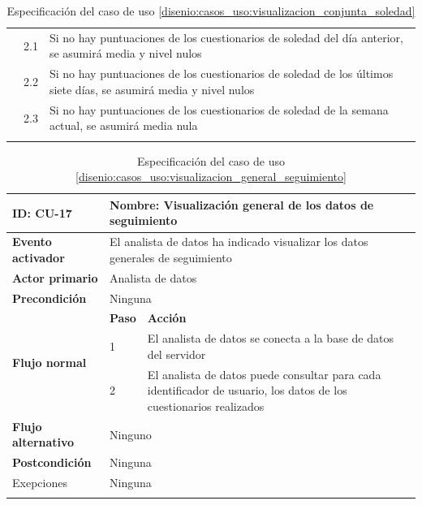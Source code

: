 \begin{table}[h]
\begin{tabularx}{\textwidth}{|l|l|X|}
                    \cline{2-3} & 2.1 & Si no hay puntuaciones de los cuestionarios de soledad del día anterior, se asumirá media y nivel nulos \\
                    \cline{2-3} & 2.2 & Si no hay puntuaciones de los cuestionarios de soledad de los últimos siete días, se asumirá media y nivel nulos \\
                    \cline{2-3} & 2.3 & Si no hay puntuaciones de los cuestionarios de soledad de la semana actual, se asumirá media nula \\
                    \hline
                    \caption{Especificación del caso de uso \ref{disenio:casos_uso:visualizacion_conjunta_soledad}}
                    \label{tabla:casos_uso:visualizacion_conjunta_soledad}
                \end{tabularx}
            \end{table}

            \begin{table}[h]
                \centering
                \begin{tabularx}{\textwidth}{|l|l|X|}
                    \hline
                    \textbf{ID:} CU-17 & \multicolumn{2}{|X|}{\textbf{Nombre}: Visualización general de los datos de seguimiento} \\
                    \hline
                    \textbf{Evento activador} & \multicolumn{2}{|X|}{El analista de datos ha indicado visualizar los datos generales de seguimiento} \\
                    \hline
                    \textbf{Actor primario} & \multicolumn{2}{|X|}{Analista de datos} \\
                    \hline
                    \textbf{Precondición} & \multicolumn{2}{|X|}{Ninguna} \\
                    \hline
                    \multirow{3}{*}{\textbf{Flujo normal}} & \textbf{Paso} & \textbf{Acción} \\
                    \cline{2-3} & 1 & El analista de datos se conecta a la base de datos del servidor \\
                    \cline{2-3} & 2 & El analista de datos puede consultar para cada identificador de usuario, los datos de los cuestionarios realizados \\
                    \hline
                    \textbf{Flujo alternativo} & \multicolumn{2}{|X|}{Ninguno} \\
                    \hline
                    \textbf{Postcondición} & \multicolumn{2}{|X|}{Ninguna} \\
                    \hline
                    Exepciones & \multicolumn{2}{|X|}{Ninguna} \\
                    \hline
                    \caption{Especificación del caso de uso \ref{disenio:casos_uso:visualizacion_general_seguimiento}}
                    \label{tabla:casos_uso:visualizacion_general_seguimiento}
                \end{tabularx}
            \end{table}
            
